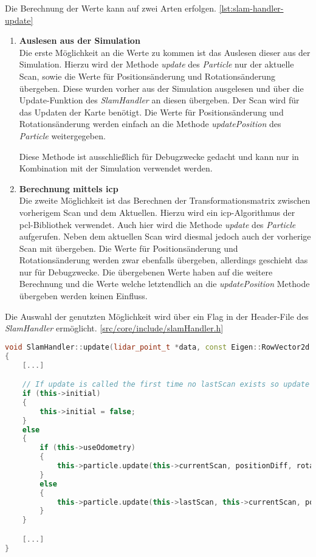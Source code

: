 Die Berechnung der Werte kann auf zwei Arten erfolgen. \ref{lst:slam-handler-update}
\begin{enumerate}
    \item \textbf{Auslesen aus der Simulation} \\
    Die erste Möglichkeit an die Werte zu kommen ist das Auslesen dieser aus der Simulation.
    Hierzu wird der Methode \textit{update} des \textit{Particle} nur der aktuelle Scan, 
    sowie die Werte für Positionsänderung und Rotationsänderung übergeben.
    Diese wurden vorher aus der Simulation ausgelesen und über die Update-Funktion des \textit{SlamHandler} an diesen übergeben.
    Der Scan wird für das Updaten der Karte benötigt.
    Die Werte für Positionsänderung und Rotationsänderung werden einfach an die Methode \textit{updatePosition} des \textit{Particle} weitergegeben.

    Diese Methode ist ausschließlich für Debugzwecke gedacht und kann nur in Kombination mit der Simulation verwendet werden.

    \item \textbf{Berechnung mittels \ac{icp}} \\
    Die zweite Möglichkeit ist das Berechnen der Transformationsmatrix zwischen vorherigem Scan und dem Aktuellen.
    Hierzu wird ein \ac{icp}-Algorithmus der \ac{pcl}-Bibliothek verwendet.
    Auch hier wird die Methode \textit{update} des \textit{Particle} aufgerufen.
    Neben dem aktuellen Scan wird diesmal jedoch auch der vorherige Scan mit übergeben.
    Die Werte für Positionsänderung und Rotationsänderung werden zwar ebenfalls übergeben, allerdings geschieht das nur für Debugzwecke.
    Die übergebenen Werte haben auf die weitere Berechnung und die Werte welche letztendlich an die \textit{updatePosition} Methode übergeben werden keinen Einfluss.
\end{enumerate}

Die Auswahl der genutzten Möglichkeit wird über ein Flag in der Header-File des \textit{SlamHandler} ermöglicht.
[\href{https://github.com/Jundy0/Studienarbeit/blob/main/src/core/include/slamHandler.h}{src/core/include/slamHandler.h}]

\begin{lstlisting}[caption={Auschnitt aus der Methode \textit{update} des \textit{SlamHandler}},label={lst:slam-handler-update},language={C++}]
void SlamHandler::update(lidar_point_t *data, const Eigen::RowVector2d &positionDiff, double rotationDiff)
{
    [...]

    // If update is called the first time no lastScan exists so update of the particle gets skipped
    if (this->initial)
    {
        this->initial = false;
    }
    else
    {
        if (this->useOdometry)
        {
            this->particle.update(this->currentScan, positionDiff, rotationDiff); // Only Ododmetry, no ICP
        }
        else
        {
            this->particle.update(this->lastScan, this->currentScan, positionDiff, rotationDiff); // Uses ICP. Odometry data gets used for debug output
        }
    }

    [...]
} 
\end{lstlisting}

